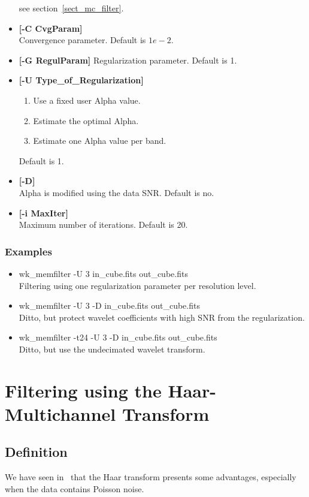 \begin{itemize}
see section~\ref{sect_mc_filter}.  
\item {\bf [-C CvgParam]} \\
Convergence parameter. Default is $1e-2$.
\item {\bf [-G RegulParam]} 
 Regularization parameter. Default is 1. 
\item {\bf [-U Type\_of\_Regularization]} 
{\small
\begin{enumerate}
\baselineskip=0.4truecm
\itemsep=0.1truecm
\item Use a fixed user Alpha value.
\item Estimate the optimal Alpha.
\item Estimate one Alpha value per band.
\end{enumerate}}
Default is 1.
\item {\bf [-D]} \\
Alpha is modified using the data SNR. Default is no.
\item {\bf [-i MaxIter]} \\
 Maximum number of iterations. Default is 20.
\end{itemize}
\subsubsection*{Examples}
\begin{itemize}
\baselineskip=0.4truecm
\itemsep=0.1truecm
\item wk\_memfilter -U 3 in\_cube.fits out\_cube.fits \\
Filtering using one regularization parameter per resolution level.
\item wk\_memfilter -U 3 -D in\_cube.fits out\_cube.fits \\
Ditto, but protect wavelet coefficients with high SNR from the regularization.
\item wk\_memfilter -t24 -U 3 -D in\_cube.fits out\_cube.fits \\
Ditto, but use the undecimated wavelet transform.
\end{itemize}



\section{Filtering using the Haar-Multichannel Transform}
\subsection{Definition}
We have seen in \proj \ that the Haar transform 
presents some advantages, especially when the data contains Poisson noise.

